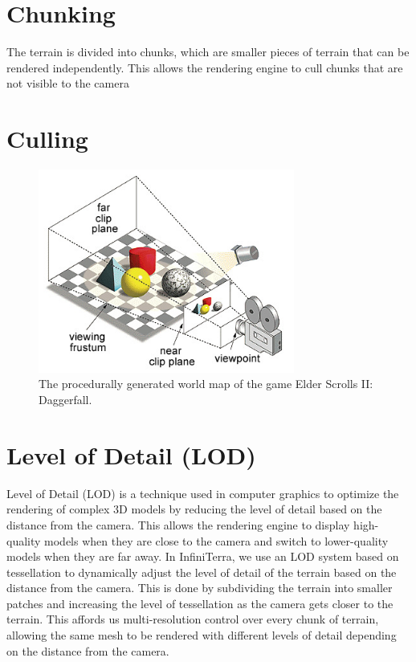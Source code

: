 \documentclass{report}
\begin{document}
\section{Chunking}
The terrain is divided into chunks, which are smaller pieces of terrain that can be rendered
independently. This allows the rendering engine to cull chunks that are not visible to the camera


\section{Culling}

\begin{figure}[h!]
	\centering
	\includegraphics[width=0.75\textwidth]{img/frustum.jpg}
	\caption{The procedurally generated world map of the game Elder Scrolls II: Daggerfall.}
	\label{fig:frustum}
\end{figure}


\section{Level of Detail (LOD)}

Level of Detail (LOD) is a technique used in computer graphics to optimize the rendering of complex
3D models by reducing the level of detail based on the distance from the camera. This allows the
rendering engine to display high-quality models when they are close to the camera and switch to
lower-quality models when they are far away. In InfiniTerra, we use an LOD system based on
tessellation to dynamically adjust the level of detail of the terrain based on the distance from
the camera. This is done by subdividing the terrain into smaller patches and increasing the level
of tessellation as the camera gets closer to the terrain. This affords us multi-resolution control
over every chunk of terrain, allowing the same mesh to be rendered with different levels of detail
depending on the distance from the camera.
\end{document}
